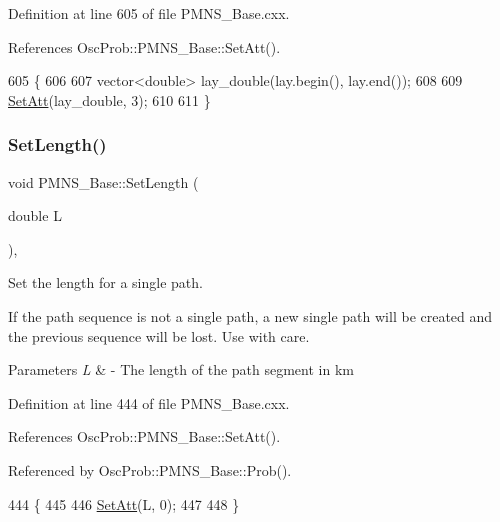 Definition at line 605 of file P\+M\+N\+S\+\_\+\+Base.\+cxx.



References Osc\+Prob\+::\+P\+M\+N\+S\+\_\+\+Base\+::\+Set\+Att().


\begin{DoxyCode}
605                                            \{
606 
607   vector<double> lay\_double(lay.begin(), lay.end());
608 
609   \hyperlink{classOscProb_1_1PMNS__Base_aba565962a440d14bee7a2a96d2eca2c5}{SetAtt}(lay\_double, 3);
610 
611 \}
\end{DoxyCode}
\mbox{\label{classOscProb_1_1PMNS__Base_a6241325b1bd28cafa556daaecbe4ed62}} 
\subsubsection{\texorpdfstring{Set\+Length()}{SetLength()}\hspace{0.1cm}{\footnotesize\ttfamily [1/2]}}
{\footnotesize\ttfamily void P\+M\+N\+S\+\_\+\+Base\+::\+Set\+Length (\begin{DoxyParamCaption}\item[{double}]{L }\end{DoxyParamCaption})\hspace{0.3cm}{\ttfamily [virtual]}, {\ttfamily [inherited]}}

Set the length for a single path.

If the path sequence is not a single path, a new single path will be created and the previous sequence will be lost. Use with care.


\begin{DoxyParams}{Parameters}
{\em L} & -\/ The length of the path segment in km \\
\hline
\end{DoxyParams}


Definition at line 444 of file P\+M\+N\+S\+\_\+\+Base.\+cxx.



References Osc\+Prob\+::\+P\+M\+N\+S\+\_\+\+Base\+::\+Set\+Att().



Referenced by Osc\+Prob\+::\+P\+M\+N\+S\+\_\+\+Base\+::\+Prob().


\begin{DoxyCode}
444                                  \{
445 
446   \hyperlink{classOscProb_1_1PMNS__Base_aba565962a440d14bee7a2a96d2eca2c5}{SetAtt}(L, 0);
447 
448 \}
\end{DoxyCode}
\mbox{\label{classOscProb_1_1PMNS__Base_aa34a40a3b5abda0f252982d9ead3b520}} 
